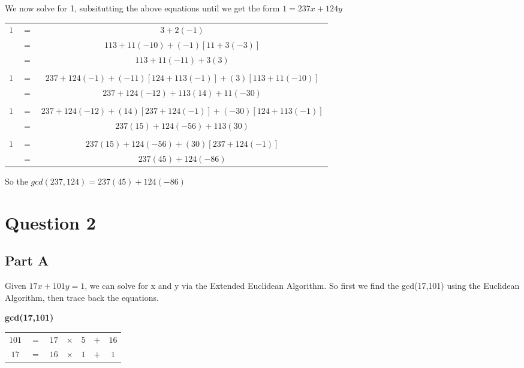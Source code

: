 \documentclass{article}
\numberwithin{equation}{subsection}
\begin{document}
	\newpage
	\thispagestyle{fancy}

	We now solve for 1, subsitutting the above equations until we get the form $1=237x+124y$

	\begin{center}
		\begin{tabular}{c c c}
			$1$	&	$=$	&	$3+2(-1)$	\\
				&	$=$	&	$113+11(-10) + (-1)[11+3(-3)]$	\\
				&	$=$	&	$113+11(-11) + 3(3)$	\\\\
			$1$	&	$=$	&	$237 + 124(-1) + (-11)[124+113(-1)] + (3)[113+11(-10)]$	\\
				&	$=$	&	$237+124(-12) +113(14) + 11(-30)$	\\\\
			$1$	&	$=$	&	$237+124(-12)+(14)[237+124(-1)] + (-30)[124+113(-1)]$	\\
				&	$=$	&	$237(15) + 124(-56) + 113(30)$	\\\\
			$1$	&	$=$	&	$237(15)+124(-56)+(30)[237+124(-1)]$\\
				&	$=$	&	$237(45)+124(-86)$\\
		\end{tabular}
	\end{center}

	\vspace{10pt}
	So the $gcd(237,124) = 237(45)+124(-86)$

	\newpage
		\thispagestyle{fancy}

	\section*{Question 2}
	\subsection*{Part A}
	Given $17x+101y=1$, we can solve for x and y via the Extended Euclidean Algorithm. So first we find the gcd(17,101) using
	the Euclidean Algorithm, then trace back the equations.

	\vspace{10pt}

	\textbf{gcd(17,101)}
	
	\begin{tabular}{c c c c c c c}
		$101$	&	$=$	&	$17$	&	$\times$	&	\underline{$5$}	&	$+$	&	\underline{$16$}	\\
		$17$	&	$=$	&	$16$	&	$\times$	&	\underline{$1$}	&	$+$	&	\underline{$1$}	\\
	\end{tabular}
\end{document}
